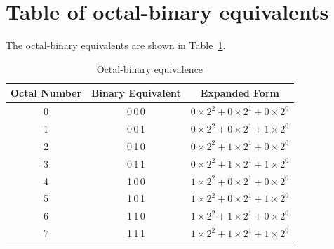 
\section{Table of octal-binary equivalents}\label{sec6.6}

The octal-binary equivalents are shown in Table~\ref{tab6.1}.
\begin{table}[H]
\centering
\caption{Octal-binary equivalence}\label{tab6.1}
\renewcommand{\arraystretch}{1.3}
\begin{tabular}{|c|c|c|}
\hline
{\bf Octal Number} & {\bf Binary Equivalent} & {\bf Expanded Form}\\
\hline
0 & 0\,0\,0 & $0\times 2^{2}+0\times 2^{1}+0\times 2^{0}$\\[3pt]
\hline
1 & 0\,0\,1 & $0\times 2^{2}+0\times 2^{1}+1\times 2^{0}$\\[3pt]
\hline
2 & 0\,1\,0 & $0\times 2^{2}+1\times 2^{1}+0\times 2^{0}$\\[3pt]
\hline
3 & 0\,1\,1 & $0\times 2^{2}+1\times 2^{1}+1\times 2^{0}$\\[3pt]
\hline
4 & 1\,0\,0 & $1\times 2^{2}+0\times 2^{1}+0\times 2^{0}$\\[3pt]
\hline
5 & 1\,0\,1 & $1\times 2^{2}+0\times 2^{1}+1\times 2^{0}$\\[3pt]
\hline
6 & 1\,1\,0 & $1\times 2^{2}+1\times 2^{1}+0\times 2^{0}$\\[3pt]
\hline
7 & 1\,1\,1 & $1\times 2^{2}+1\times 2^{1}+1\times 2^{0}$\\[3pt]
\hline
\end{tabular}
\end{table}

